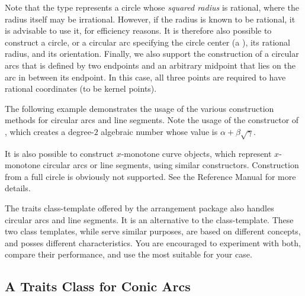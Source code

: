 Note that the  type represents a circle whose
\emph{squared radius} is rational, where the radius itself may be irrational.
However, if the radius is known to be rational, it is advisable to use it,
for efficiency reasons. It is therefore also possible to construct a circle,
or a circular arc specifying the circle center (a ), its
rational radius, and its orientation. Finally, we also support the construction
of a circular arcs that is defined by two endpoints and an arbitrary midpoint
that lies on the arc in between its endpoint. In this case, all three points
are required to have rational coordinates (to be kernel points).

The following example demonstrates the usage of the various construction
methods for circular arcs and line segments. Note the usage of the constructor
of , which creates a degree-$2$ algebraic
number whose value is $\alpha + \beta\sqrt{\gamma}$.


It is also possible to construct $x$-monotone curve objects, which represent
$x$-monotone circular arcs or line segments, using similar constructors.
Construction from a full circle is obviously not supported. See the Reference
Manual for more details.

The traits class-template
 offered by the
arrangement package also handles circular arcs and line segments. It
is an alternative to the 
class-template. These two class templates, while serve similar
purposes, are based on different concepts, and posses different
characteristics. You are encouraged to experiment with both, compare
their performance, and use the most suitable for your case.

\subsection{A Traits Class for Conic Arcs\label{arr_ssec:tr_conic}}

